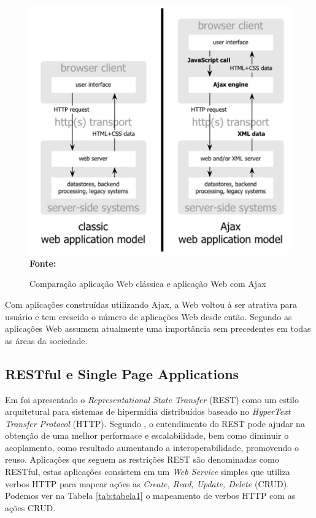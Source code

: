 \begin{figure}[!ht]
	\centering	
	\caption[\hspace{0.1cm}Comparação aplicação Web clássica e aplicação Web com Ajax.]{Comparação aplicação Web clássica e aplicação Web com Ajax}
	  \vspace{-0.4cm}
	\includegraphics[width=.6\textwidth]{figuras/ajax_comparison.png}
	 \vspace{-0.3cm}
	\\\textbf{\footnotesize Fonte: \cite{garrettAjax}}
	\label{fig:ajax_comparison}
\end{figure}


Com aplicações construídas utilizando Ajax, a Web voltou à ser atrativa para usuário e tem crescido o número de aplicações Web desde então. Segundo
\cite{tabulaRest} as aplicações Web assumem atualmente uma importância sem precedentes em todas as áreas da sociedade. 

\subsection{RESTful e Single Page Applications}
Em \cite{fieldingRest} foi apresentado o \textit{Representational State Transfer} (REST) como um estilo arquitetural para sistemas de hipermídia 
distribuídos baseado no \textit{HyperText Transfer Protocol} (HTTP). Segundo \cite{modelingRestful}, o entendimento do REST pode ajudar na obtenção 
de uma melhor performace e escalabilidade, bem como diminuir o acoplamento, como resultado aumentando a interoperabilidade, promovendo o reuso. 
Aplicações que seguem as restrições REST são denominadas como RESTful, estas aplicações consistem em um \textit{Web Service} simples que utiliza 
verbos HTTP para mapear ações as \textit{Create, Read, Update, Delete} (CRUD). Podemos ver na Tabela \ref{tab:tabela1} o mapeamento de verbos HTTP 
com as ações CRUD.


